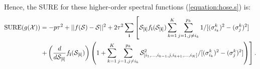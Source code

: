 Hence, the SURE for these higher-order spectral functions (\ref{equation:hose.s}) is:
\begin{align*}
\operatorname*{SURE}(g(\mathcal{X})) &= -p\tau^2 + ||f(\mathcal{S}) - \mathcal{S}||^2 + 2\tau^2\sum_{\bf i}\left[\mathcal{S}_{[\mathbf{i}]}f_{\bf i}(\mathcal{S}_{[\mathbf{i}]})\sum_{k=1}^K \sum_{j=1, j\neq i_k}^{p_k}1/[(\sigma_{i_k}^k)^2 - (\sigma_j^k)^2]\right. \\
&\left. + \left(\frac{d}{d\mathcal{S}_{[\mathbf{i}]}}f_{\mathbf{i}}(\mathcal{S}_{[\mathbf{i}]})\right) \left(1 + \sum_{k=1}^K \sum_{j=1, j\neq i_k}^{p_k}\mathcal{S}_{[i_1,\ldots,i_{k-1},j,i_{k+1},\ldots,i_K]}^2/[(\sigma_{i_k}^k)^2 - (\sigma_j^k)^2] \right)\right].
\end{align*}

